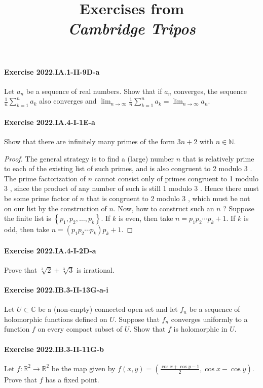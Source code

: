 \documentclass{article}
\title{\textbf{
Exercises from \\
\textit{Cambridge Tripos}
}}
\date{}
\begin{document}
\maketitle

\paragraph{Exercise 2022.IA.1-II-9D-a} Let $a_{n}$ be a sequence of real numbers. Show that if $a_{n}$ converges, the sequence $\frac{1}{n} \sum_{k=1}^{n} a_{k}$ also converges and $\lim _{n \rightarrow \infty} \frac{1}{n} \sum_{k=1}^{n} a_{k}=\lim _{n \rightarrow \infty} a_{n}$.

\paragraph{Exercise 2022.IA.4-I-1E-a} Show that there are infinitely many primes of the form $3 n+2$ with $n \in \mathbb{N}$.
\begin{proof}
    The general strategy is to find a (large) number $n$ that is relatively prime to each of the existing list of such primes, and is also congruent to 2 modulo 3 . The prime factorization of $n$ cannot consist only of primes congruent to 1 modulo 3 , since the product of any number of such is still 1 modulo 3 . Hence there must be some prime factor of $n$ that is congruent to 2 modulo 3 , which must be not on our list by the construction of $n$.
Now, how to construct such an $n$ ? Suppose the finite list is $\left\{p_1, p_2, \ldots, p_k\right\}$. If $k$ is even, then take $n=p_1 p_2 \cdots p_k+1$. If $k$ is odd, then take $n=\left(p_1 p_2 \cdots p_k\right) p_k+1$.
\end{proof}


\paragraph{Exercise 2022.IA.4-I-2D-a} Prove that $\sqrt[3]{2}+\sqrt[3]{3}$ is irrational.

\paragraph{Exercise 2022.IB.3-II-13G-a-i} Let $U \subset \mathbb{C}$ be a (non-empty) connected open set and let $f_n$ be a sequence of holomorphic functions defined on $U$. Suppose that $f_n$ converges uniformly to a function $f$ on every compact subset of $U$. Show that $f$ is holomorphic in $U$.

\paragraph{Exercise 2022.IB.3-II-11G-b} Let $f: \mathbb{R}^{2} \rightarrow \mathbb{R}^{2}$ be the map given by $f(x, y)=\left(\frac{\cos x+\cos y-1}{2}, \cos x-\cos y\right)$. Prove that $f$ has a fixed point.
\end{document}
